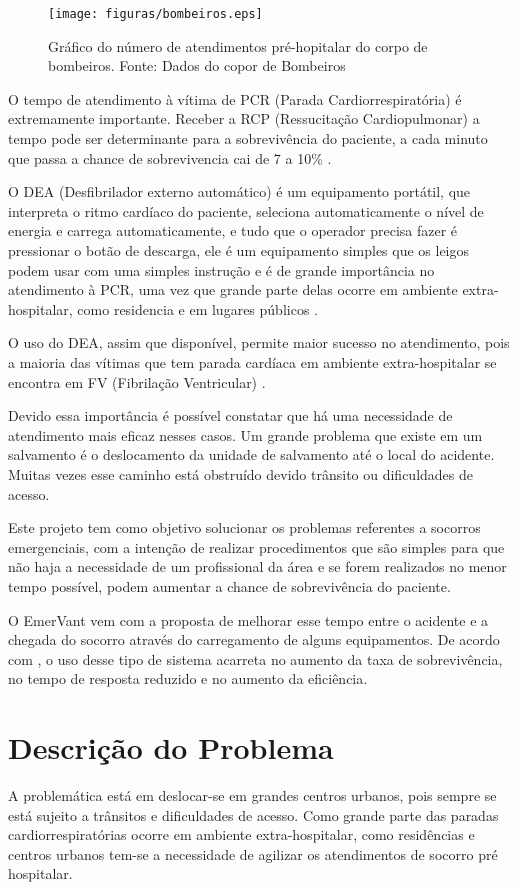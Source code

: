  \begin{figure}[ht]
	\centering
		\texttt{[image: figuras/bombeiros.eps]}
	\caption{Gráfico do número de atendimentos pré-hopitalar do corpo de bombeiros. Fonte: Dados do copor de Bombeiros}
\end{figure}

O tempo de atendimento à vítima de PCR (Parada Cardiorrespiratória) é extremamente importante. Receber a RCP (Ressucitação Cardiopulmonar) a tempo pode ser determinante para a sobrevivência do paciente, a cada minuto que passa a chance de sobrevivencia cai de 7 a 10\% \cite{SBC}. 

O DEA (Desfibrilador externo automático) é um equipamento portátil, que interpreta o ritmo cardíaco do paciente, seleciona automaticamente o nível de energia e carrega automaticamente, e tudo que o operador precisa fazer é pressionar o botão de descarga, ele é um equipamento simples que os leigos podem usar com uma simples instrução e é de grande importância no atendimento à PCR, uma vez que grande parte delas ocorre em ambiente extra-hospitalar, como residencia e em lugares públicos \cite{SBC}.

O uso do DEA, assim que disponível, permite maior sucesso no atendimento, pois a maioria das vítimas que tem parada cardíaca em ambiente extra-hospitalar se encontra em FV (Fibrilação Ventricular) \cite{SBC}.

Devido essa importância é possível constatar que há uma necessidade de atendimento mais eficaz nesses casos. Um grande problema que existe em um salvamento é o deslocamento da unidade de salvamento até o local do acidente. Muitas vezes esse caminho está obstruído devido trânsito ou dificuldades de acesso. 

Este projeto tem como objetivo solucionar os problemas referentes a socorros emergenciais, com a intenção de realizar procedimentos que são simples para que não haja a necessidade de um profissional da área e se forem realizados no menor tempo possível, podem aumentar a chance de sobrevivência do paciente. 

O EmerVant vem com a proposta de melhorar esse tempo entre o acidente e a chegada do socorro através do carregamento de alguns equipamentos. De acordo com \cite{DEE}, o uso desse tipo de sistema acarreta no aumento da taxa de sobrevivência, no tempo de resposta reduzido e no aumento da eficiência.

\section{Descrição do Problema}
	A problemática está em deslocar-se em grandes centros urbanos, pois sempre se está sujeito a trânsitos e dificuldades de acesso. Como grande parte das paradas cardiorrespiratórias ocorre em ambiente extra-hospitalar, como residências e centros urbanos \cite{SBC} tem-se a necessidade de agilizar os atendimentos de socorro pré hospitalar. 


